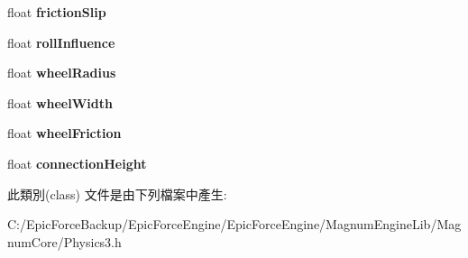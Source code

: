 \begin{DoxyCompactItemize}
\item 
float {\bfseries friction\+Slip}\hypertarget{class_magnum_1_1_physics3_1_1_vehicle_1_1_params_a8100f487f2521c4f3892d32e16689ba3}{}\label{class_magnum_1_1_physics3_1_1_vehicle_1_1_params_a8100f487f2521c4f3892d32e16689ba3}

\item 
float {\bfseries roll\+Influence}\hypertarget{class_magnum_1_1_physics3_1_1_vehicle_1_1_params_ad48b72aa576d9508f4c2ef8f39c581c5}{}\label{class_magnum_1_1_physics3_1_1_vehicle_1_1_params_ad48b72aa576d9508f4c2ef8f39c581c5}

\item 
float {\bfseries wheel\+Radius}\hypertarget{class_magnum_1_1_physics3_1_1_vehicle_1_1_params_a9626906a4b0e3b6f5251a15b06f28384}{}\label{class_magnum_1_1_physics3_1_1_vehicle_1_1_params_a9626906a4b0e3b6f5251a15b06f28384}

\item 
float {\bfseries wheel\+Width}\hypertarget{class_magnum_1_1_physics3_1_1_vehicle_1_1_params_a5f2157fe5d10957b888f1eb0eefc43ff}{}\label{class_magnum_1_1_physics3_1_1_vehicle_1_1_params_a5f2157fe5d10957b888f1eb0eefc43ff}

\item 
float {\bfseries wheel\+Friction}\hypertarget{class_magnum_1_1_physics3_1_1_vehicle_1_1_params_af95f886f95bd6b3d258ed56f58fda350}{}\label{class_magnum_1_1_physics3_1_1_vehicle_1_1_params_af95f886f95bd6b3d258ed56f58fda350}

\item 
float {\bfseries connection\+Height}\hypertarget{class_magnum_1_1_physics3_1_1_vehicle_1_1_params_a133be761fe3cbb6ad6689cc9fa7ce452}{}\label{class_magnum_1_1_physics3_1_1_vehicle_1_1_params_a133be761fe3cbb6ad6689cc9fa7ce452}

\end{DoxyCompactItemize}


此類別(class) 文件是由下列檔案中產生\+:\begin{DoxyCompactItemize}
\item 
C\+:/\+Epic\+Force\+Backup/\+Epic\+Force\+Engine/\+Epic\+Force\+Engine/\+Magnum\+Engine\+Lib/\+Magnum\+Core/Physics3.\+h\end{DoxyCompactItemize}
